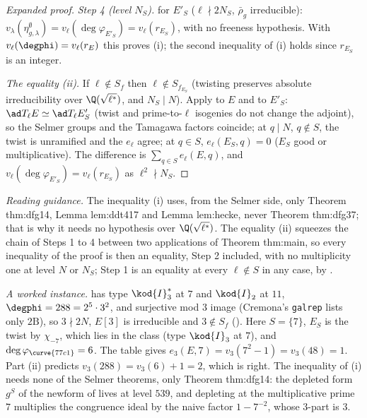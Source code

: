 \begin{sloppypar}
\begin{proof}[Expanded proof]
\emph{Step 4 (level $N_S$).}  for $E'_S$ ($\ell\nmid2N_S$, $\bar\rho_g$ irreducible): $v_\lambda(\eta^\emptyset_{g,\lambda})=v_\ell(\deg\varphi_{E'_S})=v_\ell(r_{E_S})$, with no freeness hypothesis. With
$v_\ell(\degphi)=v_\ell(r_E)$ this proves (i); the second inequality of (i) holds since $r_{E_S}$ is an integer.

\emph{The equality (ii).} If $\ell\notin S_f$ then $\ell\notin S_{f_{E_S}}$ (twisting preserves absolute irreducibility over $\Q(\sqrt{\ell^*})$, and $N_S\mid N$). Apply  to $E$ and to $E'_S$:
$\ad T_\ell E\simeq\ad T_\ell E'_S$ (twist and prime-to-$\ell$ isogenies do not change the adjoint), so the Selmer groups and the Tamagawa factors coincide; at $q\mid N$, $q\notin S$, the twist is
unramified and the $e_\ell$ agree; at $q\in S$, $e_\ell(E_S,q)=0$ ($E_S$ good or multiplicative). The difference is $\sum_{q\in S}e_\ell(E,q)$, and $v_\ell(\deg\varphi_{E'_S})=v_\ell(r_{E_S})$ as $\ell^2\nmid N_S$.
\end{proof}

\noindent\emph{Reading guidance.} The inequality (i) uses, from the Selmer side, only Theorem thm:dfg14, Lemma lem:ddt417 and Lemma lem:hecke, never Theorem thm:dfg37; that is why it
needs no hypothesis over $\Q(\sqrt{\ell^*})$. The equality (ii) squeezes the chain of Steps 1 to 4 between two applications of Theorem thm:main, so every inequality of the proof is then
an equality, Step 2 included, with no multiplicity one at level $N$ or $N_S$; Step 1 is an equality at every $\ell\notin S$ in any case, by .

\emph{A worked instance.}  has type $\kod{I}_3^*$ at $7$ and $\kod{I}_2$ at $11$, $\degphi=288=2^5\cdot3^2$, and surjective mod $3$ image (Cremona's \texttt{galrep} lists only $2\mathrm B$),
so $3\nmid2N$, $E[3]$ is irreducible and $3\notin S_f$ (). Here $S=\{7\}$, $E_S$ is the twist by $\chi_{-7}$, which lies in the class  (type $\kod{I}_3$ at $7$), and
$\deg\varphi_{\curve{77c1}}=6$. The table gives $e_3(E,7)=v_3(7^2-1)=v_3(48)=1$. Part (ii) predicts $v_3(288)=v_3(6)+1=2$, which is right. The inequality of (i) needs none of the Selmer
theorems, only Theorem thm:dfg14: the depleted form $g^S$ of the newform of  lives at level $539$, and depleting at the multiplicative prime $7$ multiplies the congruence ideal by
the naive factor $1-7^{-2}$, whose $3$-part is $3$.


\end{sloppypar}
